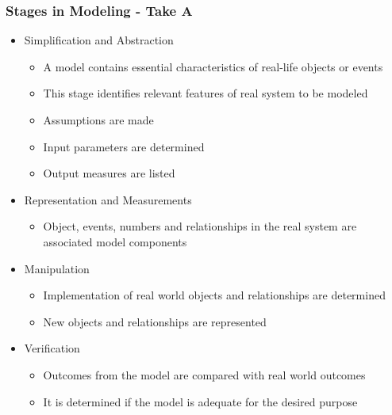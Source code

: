 \documentclass[a4paper]{article}
\begin{document}
	\subsubsection{Stages in Modeling - Take A}
	\begin{itemize}
		\item Simplification and Abstraction
		\begin{itemize}
			\item A model contains essential characteristics of
				real-life objects or events
			\item This stage identifies relevant features of real
				system to be modeled
			\item Assumptions are made
			\item Input parameters are determined
			\item Output measures are listed
		\end{itemize}
		\item Representation and Measurements
		\begin{itemize}
			\item Object, events, numbers and relationships in the
				real system are associated model components
		\end{itemize}
		\item Manipulation
		\begin{itemize}
			\item Implementation of real world objects and
				relationships are determined
			\item New objects and relationships are represented
		\end{itemize}
		\item Verification
		\begin{itemize}
			\item Outcomes from the model are compared with real
				world outcomes
			\item It is determined if the model is adequate for the
				desired purpose
		\end{itemize}
	\end{itemize}
	
\end{document}
